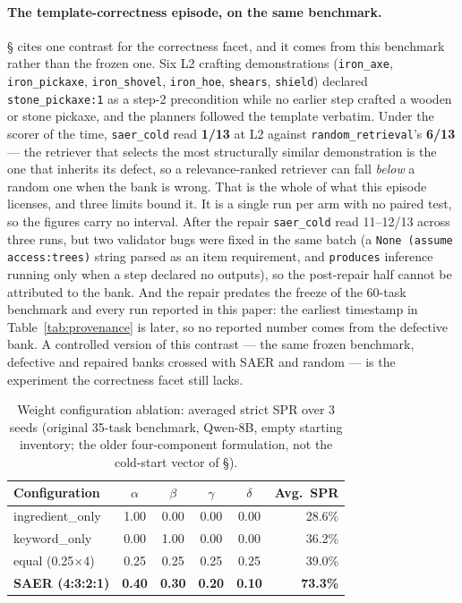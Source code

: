 \documentclass[letterpaper]{article} %
\newcommand{\bodyref}[1]{\getrefnumber{#1}}
\begin{document}
\paragraph{The template-correctness episode, on the same benchmark.}
\S\bodyref{sec:knowledge_gap} cites one contrast for the correctness facet, and it
comes from this benchmark rather than the frozen one.  Six L2 crafting
demonstrations (\texttt{iron\_axe}, \texttt{iron\_pickaxe},
\texttt{iron\_shovel}, \texttt{iron\_hoe}, \texttt{shears}, \texttt{shield})
declared \texttt{stone\_pickaxe:1} as a step-2 precondition while no earlier
step crafted a wooden or stone pickaxe, and the planners followed the template
verbatim.  Under the scorer of the time, \texttt{saer\_cold} read \textbf{1/13}
at L2 against \texttt{random\_retrieval}'s \textbf{6/13} --- the retriever that
selects the most structurally similar demonstration is the one that inherits
its defect, so a relevance-ranked retriever can fall \emph{below} a random one
when the bank is wrong.  That is the whole of what this episode licenses, and
three limits bound it.  It is a single run per arm with no paired test, so the
figures carry no interval.  After the repair \texttt{saer\_cold} read 11--12/13
across three runs, but two validator bugs were fixed in the same batch (a
\texttt{None (assume access:trees)} string parsed as an item requirement, and
\texttt{produces} inference running only when a step declared no outputs), so
the post-repair half cannot be attributed to the bank.  And the repair predates
the freeze of the 60-task benchmark and every run reported in this paper: the
earliest timestamp in Table~\ref{tab:provenance} is later, so no reported
number comes from the defective bank.  A controlled version of this contrast
--- the same frozen benchmark, defective and repaired banks crossed with SAER
and random --- is the experiment the correctness facet still lacks.

\begin{table}[tbp]
\centering
\caption{Weight configuration ablation: averaged strict SPR over 3 seeds
(original 35-task benchmark, Qwen-8B, empty starting inventory; the older
four-component formulation, not the cold-start vector of \S\bodyref{sec:scoring}).}
\label{tab:weights_ablation}
\small
\begin{tabular}{lccccr}
\toprule
Configuration & $\alpha$ & $\beta$ & $\gamma$ & $\delta$ & Avg.~SPR \\
\midrule
ingredient\_only & 1.00 & 0.00 & 0.00 & 0.00 & 28.6\% \\
keyword\_only    & 0.00 & 1.00 & 0.00 & 0.00 & 36.2\% \\
equal (0.25$\times$4) & 0.25 & 0.25 & 0.25 & 0.25 & 39.0\% \\
\textbf{SAER (4:3:2:1)} & \textbf{0.40} & \textbf{0.30} & \textbf{0.20} & \textbf{0.10} & \textbf{73.3\%} \\
\bottomrule
\end{tabular}
\end{table}
\end{document}
